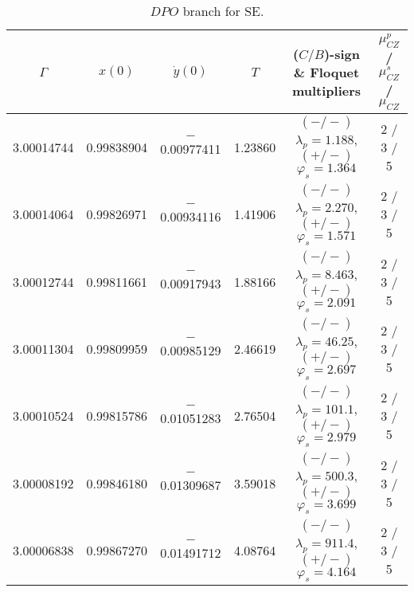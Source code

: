 \documentclass[reqno, 11pt]{amsart}
\theoremstyle{plain}
\theoremstyle{definition}
\theoremstyle{remark}
\begin{document}
\begin{table}[h]\fontsize{10}{10}\selectfont \centering
\caption{$DPO$ branch for SE.}
	\begin{tabular}{c|c|c|c|c|c}
 \hline
		$\Gamma$ & $x(0)$ & $\dot{y}(0)$ & $T$ & ($C/B$)-sign \& Floquet multipliers & $\mu_{CZ}^p$ / $\mu_{CZ}^s$ / $\mu_{CZ}$\\
		\hline 3.00014744 &	0.99838904 & $-$0.00977411 & 1.23860 & $(-/-)$ $\lambda_p = 1.188$, $(+/-)$ $\varphi_s = 1.364$ & 2 / 3 / 5\\
        3.00014064 & 0.99826971 & $-$0.00934116 & 1.41906 & $(-/-)$ $\lambda_p = 2.270$, $(+/-)$ $\varphi_s = 1.571$ & 2 / 3 / 5\\
        3.00012744 & 0.99811661 & $-$0.00917943 & 1.88166 & $(-/-)$ $\lambda_p = 8.463$, $(+/-)$ $\varphi_s = 2.091$ & 2 / 3 / 5\\
        3.00011304 & 0.99809959 & $-$0.00985129 & 2.46619 & $(-/-)$ $\lambda_p = 46.25$, $(+/-)$ $\varphi_s = 2.697$ & 2 / 3 / 5\\
        3.00010524 & 0.99815786 & $-$0.01051283 & 2.76504 & $(-/-)$ $\lambda_p = 101.1$, $(+/-)$ $\varphi_s = 2.979$ & 2 / 3 / 5\\
        3.00008192 & 0.99846180 & $-$0.01309687 & 3.59018 & $(-/-)$ $\lambda_p = 500.3$, $(+/-)$ $\varphi_s = 3.699$ & 2 / 3 / 5\\
        3.00006838 & 0.99867270 & $-$0.01491712 & 4.08764 & $(-/-)$ $\lambda_p = 911.4$, $(+/-)$ $\varphi_s = 4.164$ & 2 / 3 / 5
        \end{tabular}
	\label{data_dpo_s_e}
\end{table}
\end{document}
